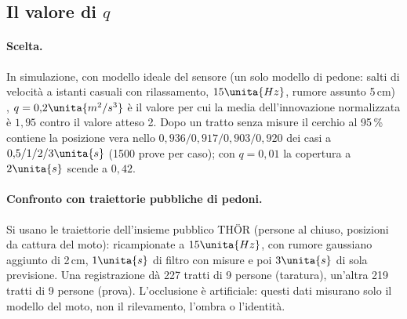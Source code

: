 \subsection{Il valore di \texorpdfstring{$q$}{q}}\label{sec:sti-q}

\paragraph{Scelta.} In simulazione, con modello ideale del sensore (un solo modello di pedone: salti di velocità a istanti casuali con rilassamento, $15\unita{Hz}$, rumore assunto 5\,cm) , $q=0{,}2\unita{m^2/s^3}$ è il valore per cui la media dell'innovazione normalizzata è $1{,}95$ contro il valore atteso 2. Dopo un tratto senza misure il cerchio al 95\,\% contiene la posizione vera nello $0{,}936/0{,}917/0{,}903/0{,}920$ dei casi a $0{,}5/1/2/3\unita{s}$ (1500 prove per caso); con $q=0{,}01$ la copertura a $2\unita{s}$ scende a $0{,}42$.

\paragraph{Confronto con traiettorie pubbliche di pedoni.} Si usano le traiettorie dell'insieme pubblico THÖR \cite{thor} (persone al chiuso, posizioni da cattura del moto): ricampionate a $15\unita{Hz}$, con rumore gaussiano aggiunto di 2\,cm, $1\unita{s}$ di filtro con misure e poi $3\unita{s}$ di sola previsione. Una registrazione dà 227 tratti di 9 persone (taratura), un'altra 219 tratti di 9 persone (prova). L'occlusione è artificiale: questi dati misurano solo il modello del moto, non il rilevamento, l'ombra o l'identità.

